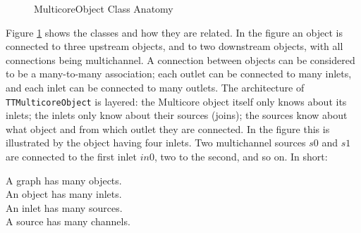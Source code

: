 \documentclass[twoside,a4paper]{article}
\begin{document}
\begin{figure}[htbp]
\centerline{}
\caption{MulticoreObject Class Anatomy}
\label{fig:anatomy}
\end{figure}

Figure \ref{fig:anatomy} shows the classes and how they are related. In the figure an object is connected to three upstream objects, and to two downstream objects, with all connections being multichannel.  A connection between objects can be considered to be a many-to-many association; each outlet can be connected to many inlets, and each inlet can be connected to many outlets. The architecture of \texttt{TTMulticoreObject} is layered: the Multicore object itself only knows about its inlets; the inlets only know about their sources (joins); the sources know about what object and from which outlet they are connected. In the figure this is illustrated by the object having four inlets. Two multichannel sources $s0$ and $s1$ are connected to the first inlet $in0$, two to the second, and so on. In short:

				A graph has many objects.\\
\indent	An object has many inlets.\\
\indent	An inlet has many sources.\\
\indent	A source has many channels.\\
\end{document}
